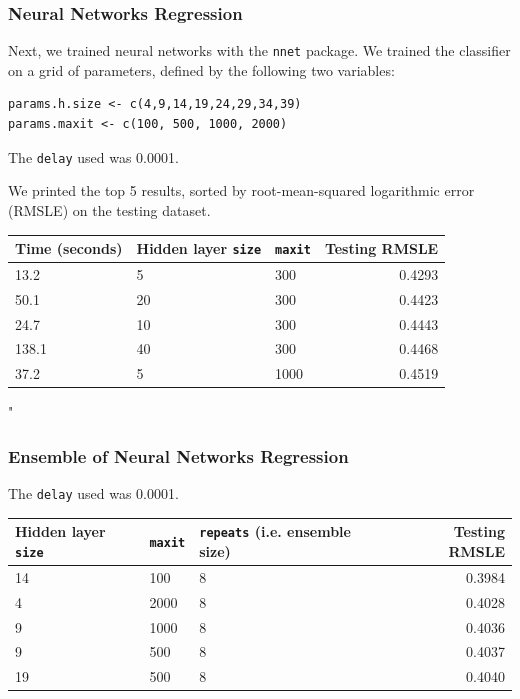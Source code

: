 \documentclass[12pt]{article}
\begin{document}
\subsubsection{Neural Networks Regression}

Next, we trained neural networks with the \texttt{nnet} package. We trained the classifier on a grid of parameters, defined by the following two variables:
{\color{blue}
\begin{verbatim}
params.h.size <- c(4,9,14,19,24,29,34,39)
params.maxit <- c(100, 500, 1000, 2000)
\end{verbatim}}

The \texttt{delay} used was 0.0001.

We printed the top 5 results, sorted by root-mean-squared logarithmic error (RMSLE) on the testing dataset.

\begin{table}[H]
	\centering
	\begin{tabular}{lllr}
		Time (seconds) & Hidden layer \texttt{size} & \texttt{maxit} & Testing RMSLE \\
		\hline
		13.2 & 5 & 300 & 0.4293\\
		50.1 & 20 & 300 & 0.4423\\
		24.7 & 10 & 300 & 0.4443\\
		138.1 & 40 & 300 & 0.4468\\
		37.2 & 5 & 1000 & 0.4519\\
	\end{tabular}
\end{table}
"
\subsubsection{Ensemble of Neural Networks Regression}

The \texttt{delay} used was 0.0001.

\begin{table}[H]
	\centering
	\begin{tabular}{lllr}
		Hidden layer \texttt{size} & \texttt{maxit} & \texttt{repeats} (i.e. ensemble size) & Testing RMSLE \\
		\hline
		14 & 100 & 8 & 0.3984\\
		4 & 2000 & 8 & 0.4028\\
		9 & 1000 & 8 & 0.4036\\
		9 & 500 & 8 & 0.4037\\
		19 & 500 & 8 & 0.4040\\
	\end{tabular}
\end{table}
\end{document}
